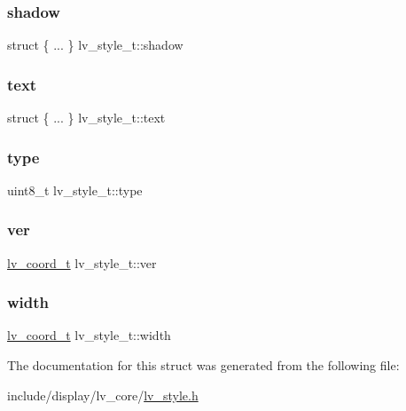 \subsubsection{\texorpdfstring{shadow}{shadow}}
{\footnotesize\ttfamily struct \{ ... \}   lv\+\_\+style\+\_\+t\+::shadow}

\mbox{\label{structlv__style__t_a7452165fdff2d6992926037ba96ccf4e}} 
\subsubsection{\texorpdfstring{text}{text}}
{\footnotesize\ttfamily struct \{ ... \}   lv\+\_\+style\+\_\+t\+::text}

\mbox{\label{structlv__style__t_aa602cf4f4f26c5192ec9984ad480c8df}} 
\subsubsection{\texorpdfstring{type}{type}}
{\footnotesize\ttfamily uint8\+\_\+t lv\+\_\+style\+\_\+t\+::type}

\mbox{\label{structlv__style__t_a48710f20c3dcb6c4f69da557206282ad}} 
\subsubsection{\texorpdfstring{ver}{ver}}
{\footnotesize\ttfamily \mbox{\hyperlink{lv__area_8h_ad98932f5017f20988532bb68b32a6d76}{lv\+\_\+coord\+\_\+t}} lv\+\_\+style\+\_\+t\+::ver}

\mbox{\label{structlv__style__t_a1d894e253883ac892145735a36828976}} 
\subsubsection{\texorpdfstring{width}{width}}
{\footnotesize\ttfamily \mbox{\hyperlink{lv__area_8h_ad98932f5017f20988532bb68b32a6d76}{lv\+\_\+coord\+\_\+t}} lv\+\_\+style\+\_\+t\+::width}



The documentation for this struct was generated from the following file\+:\begin{DoxyCompactItemize}
\item 
include/display/lv\+\_\+core/\mbox{\hyperlink{lv__style_8h}{lv\+\_\+style.\+h}}\end{DoxyCompactItemize}
